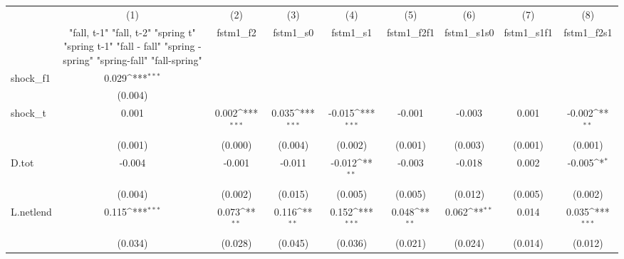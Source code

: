 {
\def\sym#1{\ifmmode^{#1}\else\(^{#1}\)\fi}
\begin{tabular}{l*{8}{c}}
\toprule
            &\multicolumn{1}{c}{(1)}&\multicolumn{1}{c}{(2)}&\multicolumn{1}{c}{(3)}&\multicolumn{1}{c}{(4)}&\multicolumn{1}{c}{(5)}&\multicolumn{1}{c}{(6)}&\multicolumn{1}{c}{(7)}&\multicolumn{1}{c}{(8)}\\
            &\multicolumn{1}{c}{  "fall, t-1" "fall, t-2" "spring t" "spring t-1"  "fall - fall" "spring - spring" "spring-fall" "fall-spring" }&\multicolumn{1}{c}{fstm1\_f2}&\multicolumn{1}{c}{fstm1\_s0}&\multicolumn{1}{c}{fstm1\_s1}&\multicolumn{1}{c}{fstm1\_f2f1}&\multicolumn{1}{c}{fstm1\_s1s0}&\multicolumn{1}{c}{fstm1\_s1f1}&\multicolumn{1}{c}{fstm1\_f2s1}\\
\midrule
shock\_f1    &       0.029\sym{***}&                     &                     &                     &                     &                     &                     &                     \\
            &     (0.004)         &                     &                     &                     &                     &                     &                     &                     \\
\addlinespace
shock\_t     &       0.001         &       0.002\sym{***}&       0.035\sym{***}&      -0.015\sym{***}&      -0.001         &      -0.003         &       0.001         &      -0.002\sym{**} \\
            &     (0.001)         &     (0.000)         &     (0.004)         &     (0.002)         &     (0.001)         &     (0.003)         &     (0.001)         &     (0.001)         \\
\addlinespace
D.tot       &      -0.004         &      -0.001         &      -0.011         &      -0.012\sym{**} &      -0.003         &      -0.018         &       0.002         &      -0.005\sym{*}  \\
            &     (0.004)         &     (0.002)         &     (0.015)         &     (0.005)         &     (0.005)         &     (0.012)         &     (0.005)         &     (0.002)         \\
\addlinespace
L.netlend   &       0.115\sym{***}&       0.073\sym{**} &       0.116\sym{**} &       0.152\sym{***}&       0.048\sym{**} &       0.062\sym{**} &       0.014         &       0.035\sym{***}\\
            &     (0.034)         &     (0.028)         &     (0.045)         &     (0.036)         &     (0.021)         &     (0.024)         &     (0.014)         &     (0.012)         \\

\end{tabular}}
